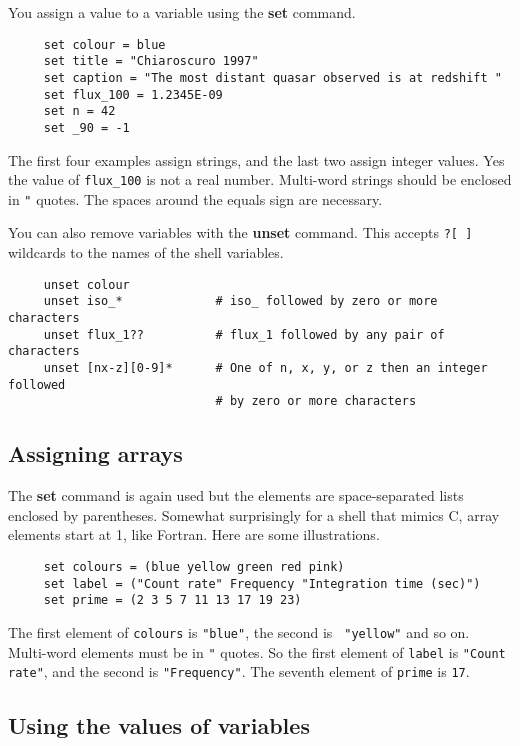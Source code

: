 You assign a value to a variable using the {\bf set} command.

\small
\begin{verbatim}
     set colour = blue
     set title = "Chiaroscuro 1997"
     set caption = "The most distant quasar observed is at redshift "
     set flux_100 = 1.2345E-09
     set n = 42
     set _90 = -1
\end{verbatim}
\normalsize
The first four examples assign strings, and the last two assign integer
values.  Yes the value of {\tt flux\_100} is not a real number.
Multi-word strings should be enclosed in {\tt "} quotes.  The spaces
around the equals sign are necessary.

You can also remove variables with the {\bf unset} command.  This
accepts {\tt *?[~]} wildcards to  the names of
the shell variables.

\small
\begin{verbatim}
     unset colour
     unset iso_*             # iso_ followed by zero or more characters
     unset flux_1??          # flux_1 followed by any pair of characters
     unset [nx-z][0-9]*      # One of n, x, y, or z then an integer followed
                             # by zero or more characters
\end{verbatim}
\normalsize


\subsection{Assigning arrays
\label{sc4-se:assign_array}}

The {\bf set} command is again used but the elements are space-separated
lists enclosed by parentheses.  Somewhat surprisingly for a shell that
mimics C, array elements start at 1, like Fortran.
Here are some illustrations.

\small
\begin{verbatim}
     set colours = (blue yellow green red pink)
     set label = ("Count rate" Frequency "Integration time (sec)")
     set prime = (2 3 5 7 11 13 17 19 23)
\end{verbatim}
\normalsize
The first element of {\tt colours} is {\tt "blue"}, the second is {\tt
"yellow"} and so on.  Multi-word elements must be in {\tt "} quotes.  So
the first element of {\tt label} is {\tt "Count rate"}, and the second
is {\tt "Frequency"}.  The seventh element of {\tt prime} is {\tt 17}.

\subsection{Using the values of variables
\label{sc4_se_values}}

